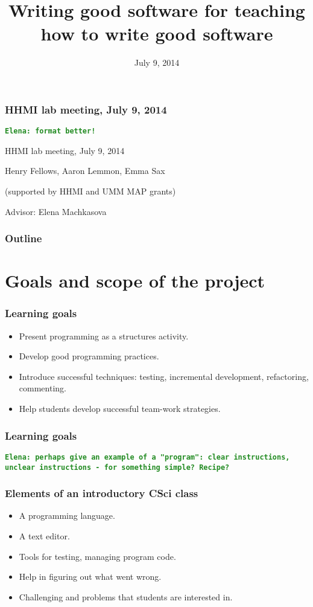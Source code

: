 \documentclass{beamer}
\newcommand{\comment}[1]{{\bf \tt  {#1}}}
\newcommand{\emcomment}[1]{\textcolor{ForestGreen}{\comment{Elena: {#1}}}}
\begin{document}
\title{Writing good software for teaching how to write good software}
\date{July 9, 2014}

\begin{frame}
\frametitle{HHMI lab meeting, July 9, 2014}
\emcomment{format better!}

{\centering
HHMI lab meeting, July 9, 2014 \par
}
Henry Fellows, Aaron Lemmon, Emma Sax\par
(supported by HHMI and UMM MAP grants)\par
Advisor: Elena Machkasova \par
\end{frame}

\begin{frame}[fragile]
\frametitle{Outline}
	\tableofcontents
\end{frame}


\section{Goals and scope of the project}

\begin{frame}[fragile]
\frametitle{Learning goals}
\begin{itemize}
\item Present programming as a structures activity.
\item Develop good programming practices.
\item Introduce successful techniques: testing, incremental development, refactoring, commenting. 
\item Help students develop successful team-work strategies. 
\end{itemize}
\end{frame}

\begin{frame}[fragile]
\frametitle{Learning goals}
\emcomment{perhaps give an example of a "program": clear instructions, unclear instructions - for something simple? Recipe?}
\end{frame}

\begin{frame}[fragile]
\frametitle{Elements of an introductory CSci class}
\begin{itemize}
\item A programming language. 
\item A text editor.
\item Tools for testing, managing program code. 
\item Help in figuring out what went wrong.
\item Challenging and problems that students are interested in.
\end{itemize}
\end{frame}
\end{document}
